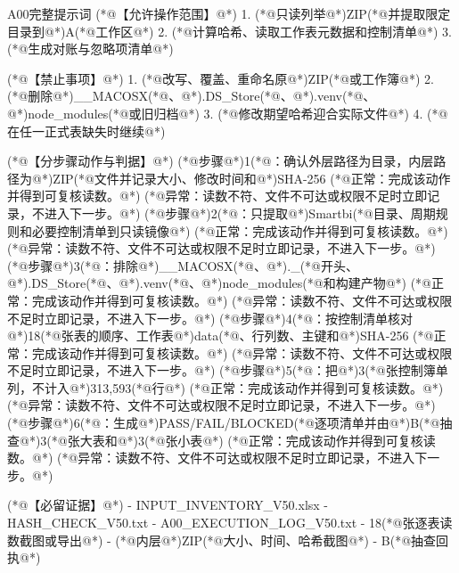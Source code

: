 \documentclass[UTF8,openany,zihao=-4]{ctexbook}
\renewcommand{\_}{\textunderscore\allowbreak}
\begin{document}
\begin{PromptBox}{A00完整提示词}
(*@{\promptcjk 【允许操作范围】}@*)
1. (*@{\promptcjk 只读列举}@*)ZIP(*@{\promptcjk 并提取限定目录到}@*)A(*@{\promptcjk 工作区}@*)
2. (*@{\promptcjk 计算哈希、读取工作表元数据和控制清单}@*)
3. (*@{\promptcjk 生成对账与忽略项清单}@*)

(*@{\promptcjk 【禁止事项】}@*)
1. (*@{\promptcjk 改写、覆盖、重命名原}@*)ZIP(*@{\promptcjk 或工作簿}@*)
2. (*@{\promptcjk 删除}@*)__MACOSX(*@{\promptcjk 、}@*).DS_Store(*@{\promptcjk 、}@*).venv(*@{\promptcjk 、}@*)node_modules(*@{\promptcjk 或旧归档}@*)
3. (*@{\promptcjk 修改期望哈希迎合实际文件}@*)
4. (*@{\promptcjk 在任一正式表缺失时继续}@*)

(*@{\promptcjk 【分步骤动作与判据】}@*)
(*@{\promptcjk 步骤}@*)1(*@{\promptcjk ：确认外层路径为目录，内层路径为}@*)ZIP(*@{\promptcjk 文件并记录大小、修改时间和}@*)SHA-256
  (*@{\promptcjk 正常：完成该动作并得到可复核读数。}@*)
  (*@{\promptcjk 异常：读数不符、文件不可达或权限不足时立即记录，不进入下一步。}@*)
(*@{\promptcjk 步骤}@*)2(*@{\promptcjk ：只提取}@*)Smartbi(*@{\promptcjk 目录、周期规则和必要控制清单到只读镜像}@*)
  (*@{\promptcjk 正常：完成该动作并得到可复核读数。}@*)
  (*@{\promptcjk 异常：读数不符、文件不可达或权限不足时立即记录，不进入下一步。}@*)
(*@{\promptcjk 步骤}@*)3(*@{\promptcjk ：排除}@*)__MACOSX(*@{\promptcjk 、}@*)._(*@{\promptcjk 开头、}@*).DS_Store(*@{\promptcjk 、}@*).venv(*@{\promptcjk 、}@*)node_modules(*@{\promptcjk 和构建产物}@*)
  (*@{\promptcjk 正常：完成该动作并得到可复核读数。}@*)
  (*@{\promptcjk 异常：读数不符、文件不可达或权限不足时立即记录，不进入下一步。}@*)
(*@{\promptcjk 步骤}@*)4(*@{\promptcjk ：按控制清单核对}@*)18(*@{\promptcjk 张表的顺序、工作表}@*)data(*@{\promptcjk 、行列数、主键和}@*)SHA-256
  (*@{\promptcjk 正常：完成该动作并得到可复核读数。}@*)
  (*@{\promptcjk 异常：读数不符、文件不可达或权限不足时立即记录，不进入下一步。}@*)
(*@{\promptcjk 步骤}@*)5(*@{\promptcjk ：把}@*)3(*@{\promptcjk 张控制簿单列，不计入}@*)313,593(*@{\promptcjk 行}@*)
  (*@{\promptcjk 正常：完成该动作并得到可复核读数。}@*)
  (*@{\promptcjk 异常：读数不符、文件不可达或权限不足时立即记录，不进入下一步。}@*)
(*@{\promptcjk 步骤}@*)6(*@{\promptcjk ：生成}@*)PASS/FAIL/BLOCKED(*@{\promptcjk 逐项清单并由}@*)B(*@{\promptcjk 抽查}@*)3(*@{\promptcjk 张大表和}@*)3(*@{\promptcjk 张小表}@*)
  (*@{\promptcjk 正常：完成该动作并得到可复核读数。}@*)
  (*@{\promptcjk 异常：读数不符、文件不可达或权限不足时立即记录，不进入下一步。}@*)

(*@{\promptcjk 【必留证据】}@*)
- INPUT_INVENTORY_V50.xlsx
- HASH_CHECK_V50.txt
- A00_EXECUTION_LOG_V50.txt
- 18(*@{\promptcjk 张逐表读数截图或导出}@*)
- (*@{\promptcjk 内层}@*)ZIP(*@{\promptcjk 大小、时间、哈希截图}@*)
- B(*@{\promptcjk 抽查回执}@*)


\end{PromptBox}
\end{document}
